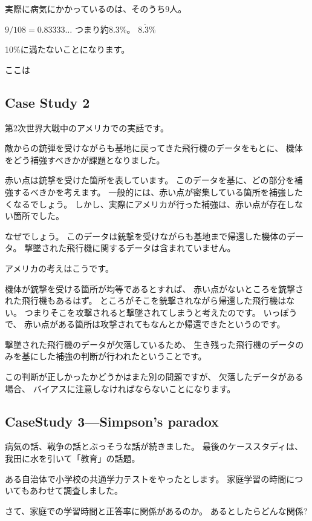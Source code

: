 \documentclass[uplatex,jis2004,dvipdfmx,12pt]{jsarticle}
\begin{document}
実際に病気にかかっているのは、そのうち9人。

$9/108=0.83333\dots$
つまり約8.3\%。
$8.\dot{3}\%$

10\%に満たないことになります。


ここは



\subsection{Case Study 2}

第2次世界大戦中のアメリカでの実話です。


敵からの銃弾を受けながらも基地に戻ってきた飛行機のデータをもとに、
機体をどう補強すべきかが課題となりました。

赤い点は銃撃を受けた箇所を表しています。
このデータを基に、どの部分を補強するべきかを考えます。
一般的には、赤い点が密集している箇所を補強したくなるでしょう。
しかし、実際にアメリカが行った補強は、赤い点が存在しない箇所でした。


なぜでしょう。
このデータは銃撃を受けながらも基地まで帰還した機体のデータ。
撃墜された飛行機に関するデータは含まれていません。

アメリカの考えはこうです。

機体が銃撃を受ける箇所が均等であるとすれば、
赤い点がないところを銃撃された飛行機もあるはず。
ところがそこを銃撃されながら帰還した飛行機はない。
つまりそこを攻撃されると撃墜されてしまうと考えたのです。
いっぽうで、
赤い点がある箇所は攻撃されてもなんとか帰還できたというのです。

撃墜された飛行機のデータが欠落しているため、
生き残った飛行機のデータのみを基にした補強の判断が行われたということです。

この判断が正しかったかどうかはまた別の問題ですが、
欠落したデータがある場合、
バイアスに注意しなければならないことになります。


\subsection{CaseStudy 3---Simpson's paradox}


病気の話、戦争の話とぶっそうな話が続きました。
最後のケーススタディは、我田に水を引いて「教育」の話題。


ある自治体で小学校の共通学力テストをやったとします。
家庭学習の時間についてもあわせて調査しました。


さて、家庭での学習時間と正答率に関係があるのか。
あるとしたらどんな関係?
\end{document}
